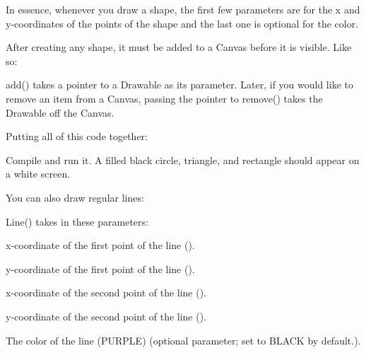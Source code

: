 In essence, whenever you draw a shape, the first few parameters are for the x and y-\/coordinates of the points of the shape and the last one is optional for the color.

After creating any shape, it must be added to a Canvas before it is visible. Like so\+: 
\begin{DoxyCode}{0}
\end{DoxyCode}


{\ttfamily add()} takes a pointer to a Drawable as its parameter. Later, if you would like to remove an item from a Canvas, passing the pointer to {\ttfamily remove()} takes the Drawable off the Canvas.

Putting all of this code together\+:


\begin{DoxyCode}{0}
\DoxyCodeLine{\textcolor{preprocessor}{\#include <tsgl.h>}}
\DoxyCodeLine{}
\DoxyCodeLine{\}}
\end{DoxyCode}


Compile and run it. A filled black circle, triangle, and rectangle should appear on a white screen.

You can also draw regular lines\+:


\begin{DoxyCode}{0}
\end{DoxyCode}


{\ttfamily Line()} takes in these parameters\+:


\begin{DoxyItemize}
\item x-\/coordinate of the first point of the line ({}).
\item y-\/coordinate of the first point of the line ({}).
\item x-\/coordinate of the second point of the line ({}).
\item y-\/coordinate of the second point of the line ({}).
\item The color of the line ({\ttfamily P\+U\+R\+P\+LE}) (optional parameter; set to {\ttfamily B\+L\+A\+CK} by default.).
\end{DoxyItemize}

